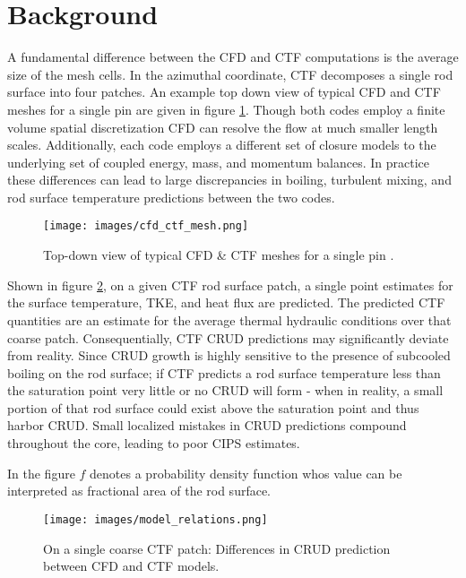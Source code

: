 \section{Background}

A fundamental difference between the CFD and CTF computations is the average size of the mesh cells.  In the azimuthal coordinate, CTF decomposes a single rod surface into four patches.  An example top down view of typical CFD and CTF meshes for a single pin are given in figure \ref{fig:cfd_ctf_mesh}.  Though both codes employ a finite volume spatial discretization CFD can resolve the flow at much smaller length scales.  Additionally, each code employs a different set of closure models to the underlying set of coupled energy, mass, and momentum balances.  In practice these differences can lead to large discrepancies in boiling, turbulent mixing, and rod surface temperature predictions between the two codes.

\begin{figure}[!htbp]
\centering
\texttt{[image: images/cfd\_ctf\_mesh.png]}
\caption{Top-down view of typical CFD \& CTF meshes for a single pin \cite{salko12}.}
\label{fig:cfd_ctf_mesh}
\end{figure}

Shown in figure \ref{fig:model_overview}, on a given CTF rod surface patch, a single point estimates for the surface temperature, TKE, and heat flux are predicted.  The predicted CTF quantities are an estimate for the average thermal hydraulic conditions over that coarse patch.   Consequentially, CTF CRUD predictions may significantly deviate from reality.  Since CRUD growth is highly sensitive to the presence of subcooled boiling on the rod surface; if CTF predicts a rod surface temperature less than the saturation point very little or no CRUD will form - when in reality, a small portion of that rod surface could exist above the saturation point and thus harbor CRUD.  Small localized mistakes in CRUD predictions compound throughout the core, leading to poor CIPS estimates. 

In the figure $f$ denotes a probability density function whos value can be interpreted as fractional area of the rod surface.  
\begin{figure}[!htbp]
\centering
\texttt{[image: images/model\_relations.png]}
\caption{On a single coarse CTF patch: Differences in CRUD prediction between CFD and CTF models.}
\label{fig:model_overview}
\end{figure}

